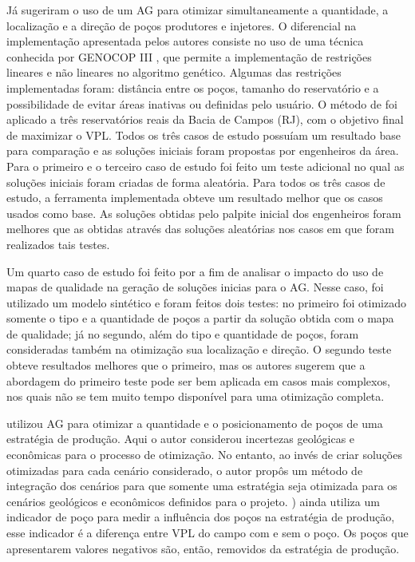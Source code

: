 Já  sugeriram o uso de um AG para otimizar simultaneamente a quantidade, a localização e a direção de poços produtores e injetores. O diferencial na implementação apresentada pelos autores consiste no uso de uma técnica conhecida por GENOCOP III \cite{Michalewicz1995}, que permite a implementação de restrições lineares e não lineares no algoritmo genético. Algumas das restrições implementadas foram: distância entre os poços, tamanho do reservatório e a possibilidade de evitar áreas inativas ou definidas pelo usuário. O método de  foi aplicado a três reservatórios reais da Bacia de Campos (RJ), com o objetivo final de maximizar o VPL. Todos os três casos de estudo possuíam um resultado base para comparação e as soluções iniciais foram propostas por engenheiros da área. Para o primeiro e o terceiro caso de estudo foi feito um teste adicional no qual as soluções iniciais foram criadas de forma aleatória. Para todos os três casos de estudo, a ferramenta implementada obteve um resultado melhor que os casos usados como base. As soluções obtidas pelo palpite inicial dos engenheiros foram melhores que as obtidas através das soluções aleatórias nos casos em que foram realizados tais testes.

Um quarto caso de estudo foi feito por  a fim de analisar o impacto do uso de mapas de qualidade na geração de soluções inicias para o AG. Nesse caso, foi utilizado um modelo sintético e foram feitos dois testes: no primeiro foi otimizado somente o tipo e a quantidade de poços a partir da solução obtida com o mapa de qualidade; já no segundo, além do tipo e quantidade de poços, foram consideradas também na otimização sua localização e direção. O segundo teste obteve resultados melhores que o primeiro, mas os autores sugerem que a abordagem do primeiro teste pode ser bem aplicada em casos mais complexos, nos quais não se tem muito tempo disponível para uma otimização completa.

 utilizou AG para otimizar a quantidade e o posicionamento de poços de uma estratégia de produção. Aqui o autor considerou incertezas geológicas e econômicas para o processo de otimização. No entanto, ao invés de criar soluções otimizadas para cada cenário considerado, o autor propôs um método de integração dos cenários para que somente uma estratégia seja otimizada para os cenários geológicos e econômicos definidos para o projeto. ) ainda utiliza um indicador de poço para medir a influência dos poços na estratégia de produção, esse indicador é a diferença entre VPL do campo com e sem o poço. Os poços que apresentarem valores negativos são, então, removidos da estratégia de produção. 

